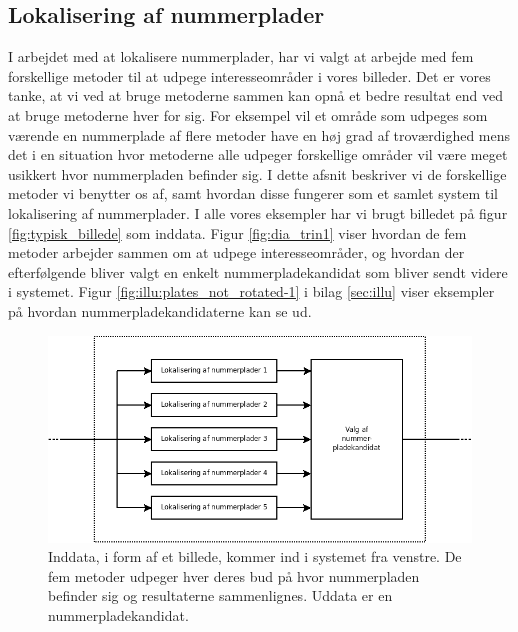 \label{sec_billed}

\subsection{Lokalisering af nummerplader}
\label{sec:system:lokalisering}
I arbejdet med at lokalisere nummerplader, har vi valgt at arbejde med fem forskellige metoder til at udpege interesseområder i vores billeder. Det er vores tanke, at vi ved at bruge metoderne sammen kan opnå et bedre resultat end ved at bruge metoderne hver for sig. For eksempel vil et område som udpeges som værende en nummerplade af flere metoder have en høj grad af troværdighed mens det i en situation hvor metoderne alle udpeger forskellige områder vil være meget usikkert hvor nummerpladen befinder sig. I dette afsnit beskriver vi de forskellige metoder vi benytter os af, samt hvordan disse fungerer som et samlet system til lokalisering af nummerplader. I alle vores eksempler har vi brugt billedet på figur \vref{fig:typisk_billede} som inddata. Figur \vref{fig:dia_trin1} viser hvordan de fem metoder arbejder sammen om at udpege interesseområder, og hvordan der efterfølgende bliver valgt en enkelt nummerpladekandidat som bliver sendt videre i systemet. Figur \vref{fig:illu:plates_not_rotated-1} i bilag \ref{sec:illu} viser eksempler på hvordan nummerpladekandidaterne kan se ud.


\begin{figure}[htp]
\centering
\includegraphics[width=12cm]{system/illu/dia_trin1.png} 
\caption{Inddata, i form af et billede, kommer ind i systemet fra venstre. De fem metoder udpeger hver deres bud på hvor nummerpladen befinder sig og resultaterne sammenlignes. Uddata er en nummerpladekandidat.}
\label{fig:dia_trin1}
\end{figure}

